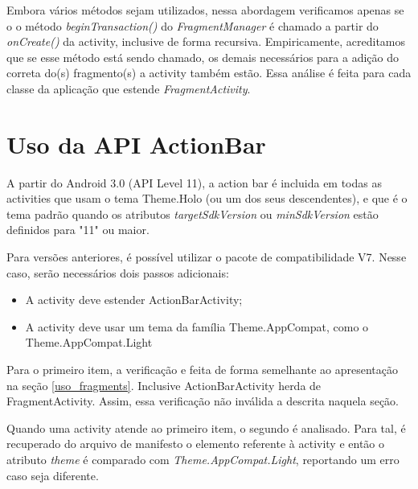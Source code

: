 Embora vários métodos sejam utilizados, nessa abordagem verificamos apenas se o
o método {\it beginTransaction()} do {\it FragmentManager} é chamado a partir do
{\it onCreate()} da activity, inclusive de forma recursiva. Empiricamente,
acreditamos que se esse método está sendo chamado, os demais necessários para a
adição do correta do(s) fragmento(s) a activity também estão. Essa análise é feita
para cada classe da aplicação que estende {\it FragmentActivity}.

\section{Uso da API ActionBar}

A partir do Android 3.0 (API Level 11), a action bar é incluida em todas as
activities que usam o tema Theme.Holo (ou um dos seus descendentes), e que é o
tema padrão quando os atributos {\it targetSdkVersion} ou {\it minSdkVersion}
estão definidos para "11" ou maior.

Para versões anteriores, é possível utilizar o pacote de compatibilidade V7.
Nesse caso, serão necessários dois passos adicionais:

\begin{itemize}
  \item{A activity deve estender ActionBarActivity;}
  \item{A activity deve usar um tema da família Theme.AppCompat, como o
  Theme.AppCompat.Light}
\end{itemize}

Para o primeiro item, a verificação e feita de forma semelhante ao apresentação
na seção \ref{uso_fragments}. Inclusive ActionBarActivity herda de FragmentActivity.
Assim, essa verificação não inválida a descrita naquela seção.

Quando uma activity atende ao primeiro item, o segundo é analisado. Para tal,
é recuperado do arquivo de manifesto o elemento referente à activity e então
o atributo {\it theme} é comparado com {\it Theme.AppCompat.Light}, reportando
um erro caso seja diferente.

